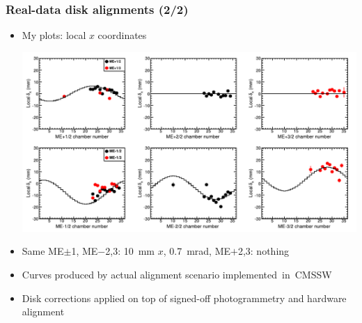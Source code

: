 \documentclass[compress]{beamer}
\begin{document}
\begin{frame}
\frametitle{Real-data disk alignments (2/2)}
\begin{itemize}
\item My plots: local $x$ coordinates

\includegraphics[width=\linewidth]{Jimsplots_localcoords.pdf}

\item Same ME$\pm$1, ME$-$2,3: 10~mm $x$, 0.7~mrad, ME$+$2,3: nothing

\item Curves produced by actual alignment scenario \mbox{implemented in CMSSW\hspace{-1 cm}}

\item Disk corrections applied on top of signed-off photogrammetry and hardware alignment
\end{itemize}
\end{frame}
\end{document}
